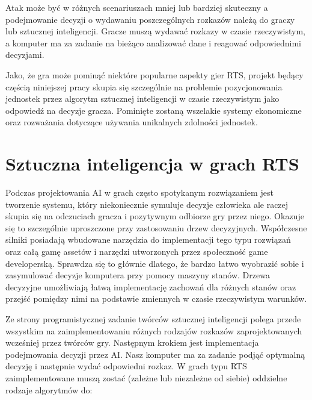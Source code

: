 \documentclass[12pt]{report}
\begin{document}
Atak może być w różnych scenariuszach mniej lub bardziej skuteczny a podejmowanie decyzji o wydawaniu poszczególnych rozkazów należą do graczy lub sztucznej inteligencji. Gracze muszą wydawać rozkazy w czasie rzeczywistym, a komputer ma za zadanie na bieżąco analizować dane i reagować odpowiednimi decyzjami.

Jako, że gra może pominąć niektóre popularne aspekty gier RTS, projekt będący częścią niniejszej pracy skupia się szczególnie na problemie pozycjonowania jednostek przez algorytm sztucznej inteligencji w czasie rzeczywistym jako odpowiedź na decyzje gracza. Pominięte zostaną wszelakie systemy ekonomiczne oraz rozważania dotyczące używania unikalnych zdolności jednostek.
\section {Sztuczna inteligencja w grach RTS}
Podczas projektowania AI w grach często spotykanym rozwiązaniem jest tworzenie systemu, który niekoniecznie symuluje decyzje człowieka ale raczej skupia się na odczuciach gracza i pozytywnym odbiorze gry przez niego. Okazuje się to szczególnie uproszczone przy zastosowaniu drzew decyzyjnych. Współczesne silniki posiadają wbudowane narzędzia do implementacji tego typu rozwiązań oraz całą gamę assetów i narzędzi utworzonych przez społeczność game developerską. Sprawdza się to głównie dlatego, że bardzo łatwo wyobrazić sobie i zasymulować decyzje komputera przy pomocy maszyny stanów. Drzewa decyzyjne umożliwiają łatwą implementację zachowań dla różnych stanów oraz przejść pomiędzy nimi na podstawie zmiennych w czasie rzeczywistym warunków.

Ze strony programistycznej zadanie twórców sztucznej inteligencji polega przede wszystkim na zaimplementowaniu różnych rodzajów rozkazów zaprojektowanych wcześniej przez twórców gry. Następnym krokiem jest implementacja podejmowania decyzji przez AI. Nasz komputer ma za zadanie podjąć optymalną decyzję i następnie wydać odpowiedni rozkaz. W grach typu RTS zaimplementowane muszą zostać (zależne lub niezależne od siebie) oddzielne rodzaje algorytmów do: 
\end{document}
